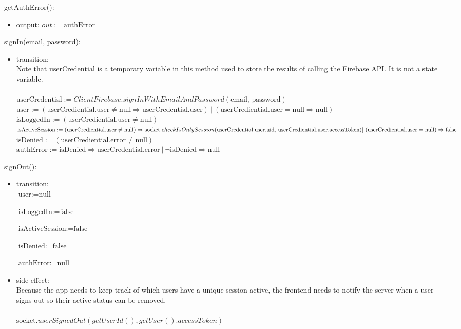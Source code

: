 \documentclass[12pt, titlepage]{article}
\begin{document}
\noindent getAuthError():
\begin{itemize}
\item output: $out := \text{authError}$
\end{itemize}

\noindent signIn(email, password):
\begin{itemize}
\item transition: \\
Note that $\text{userCredential}$ is a temporary variable in this method used to store the results of calling the Firebase API. It is not a state variable. \\ \\
$\text{userCredential} :=  ClientFirebase.signInWithEmailAndPassword(\text{email, password})$ \\

$\text{user} := (\text{userCrediential.user} \neq \text{null} \Rightarrow \text{userCredential.user}) \ | \ (\text{userCrediential.user} = \text{null} \Rightarrow \text{null})$ \\

$\text{isLoggedIn} := (\text{userCrediential.user} \neq \text{null})$ \\

$\text{isActiveSession} := \\ (\text{userCrediential.user} \neq \text{null}) \\ \Rightarrow \text{socket}.checkIsOnlySession(\text{userCredential.user.uid, userCrediential.user.accessToken}) \\
| \ (\text{userCrediential.user} = \text{null}) \Rightarrow \text {false}$ \\

$\text{isDenied} := (\text{userCrediential.error} \neq \text{null})$ \\

$\text{authError} := \text{isDenied} \Rightarrow \text{userCredential.error} \ | \ \lnot \text{isDenied} \Rightarrow \text{null} $

\end{itemize}

\noindent signOut():
\begin{itemize}
\item transition: \\
$\text{user} := \text{null}$ 

$\text{isLoggedIn} := \text{false}$ 

$\text{isActiveSession} := \text{false}$

$\text{isDenied} := \text{false}$

$\text{authError} := \text{null}$

\item side effect: \\
Because the app needs to keep track of which users have a unique session active, the frontend needs to notify the server when a user signs out so their active status can be removed. \\ \\
$\text{socket}.userSignedOut(getUserId(), getUser().accessToken)$

\end{itemize}
\end{document}
